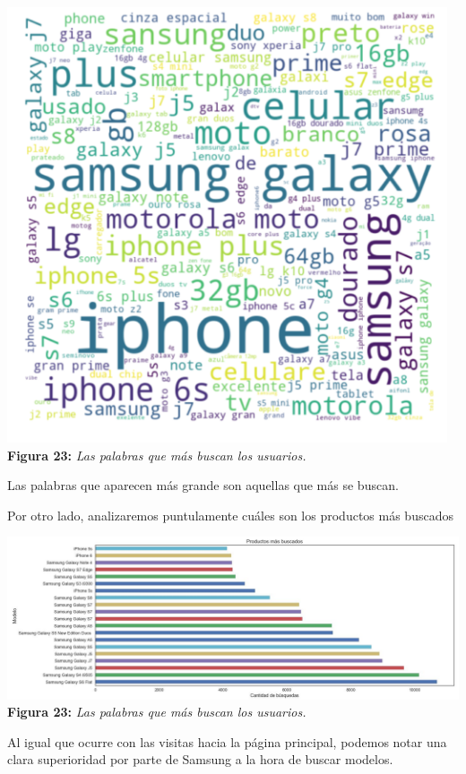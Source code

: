 \documentclass[titlepage,a4paper]{article}
\begin{document}
	\begin{center}
	\includegraphics[width=13cm] {palabrasQueMasBuscanLosUsuarios.jpg}\\
	\textbf{Figura 23:}  \textit{Las palabras que más buscan los usuarios. }
	\end{center}
	
	Las palabras que aparecen más grande son aquellas que más se buscan.
	
	Por otro lado, analizaremos puntulamente cuáles son los productos más buscados
	\begin{center}
	\includegraphics[width=15cm] {productosMasBuscados.jpg}\\
	\textbf{Figura 23:}  \textit{Las palabras que más buscan los usuarios. }
	\end{center} 
	
	Al igual que ocurre con las visitas hacia la página principal, podemos notar una clara superioridad por parte de Samsung a la hora de buscar modelos.
	
\end{document}
